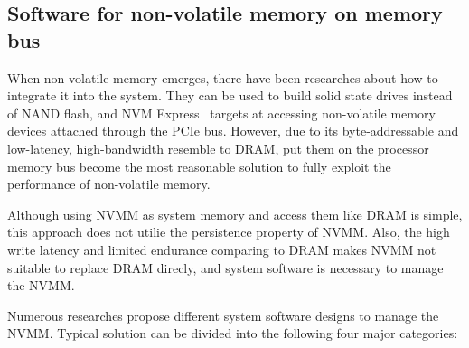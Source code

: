 \begin{table}
	\vspace*{1mm}
	\caption{}
	\label{table:techtrend}
\end{table}

\subsection{Software for non-volatile memory on memory bus}
\label{sec:NVMM}

When non-volatile memory emerges, there have been researches about how to
integrate it into the system. They can be used to build solid state drives
instead of NAND flash, and NVM Express~\cite{NVMe} targets at accessing
non-volatile memory devices attached through the PCIe bus. However, due to
its byte-addressable and low-latency, high-bandwidth resemble to DRAM,
put them on the processor memory bus become the most reasonable solution
to fully exploit the performance of non-volatile memory.

Although using NVMM as system memory and access them like DRAM is simple,
this approach does not utilie the persistence property of NVMM. Also, the
high write latency and limited endurance comparing to DRAM makes NVMM not
suitable to replace DRAM direcly, and system software is necessary to
manage the NVMM.

Numerous researches propose different system software designs to
manage the NVMM. Typical solution can be divided into the following
four major categories:

